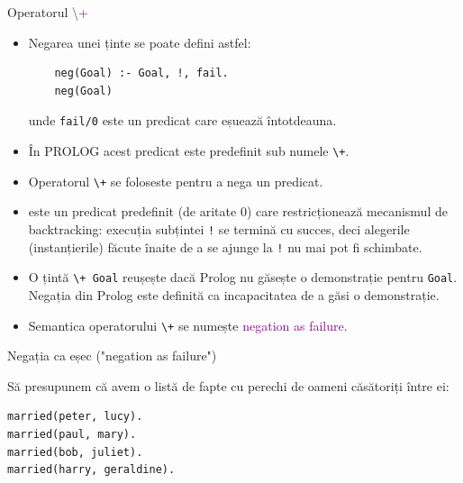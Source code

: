 \documentclass[xcolor=x11names,compress,10pt]{beamer}
\begin{document}
\begin{frame}[fragile]{Operatorul \textcolor{purple}{\textbackslash +}}

\begin{itemize}
	\item  Negarea unei ținte se poate defini astfel:
	
	\begin{verbatim}
    neg(Goal) :- Goal, !, fail.
    neg(Goal)
	\end{verbatim}

unde  \alert{\texttt{fail/0}} este un predicat care eșuează întotdeauna.
\pause
\item \^{I}n PROLOG acest predicat este predefinit sub numele {\texttt {\textbackslash +}}. 
\item Operatorul  \texttt{\textbackslash +} se foloseste pentru a nega un predicat.
	\item {} este un predicat predefinit (de aritate 0) care restricționează mecanismul de backtracking:   execuția subțintei \texttt{!} se termină  cu succes, deci alegerile (instanțierile) făcute  înaite de a se ajunge la \texttt{{!}}  nu mai pot fi schimbate.
	
\item O țintă \texttt{\textbackslash + Goal} reușește dacă Prolog nu găsește o demonstrație pentru \texttt{Goal}. Negația din Prolog este definită ca incapacitatea de a găsi o demonstrație.

	\item Semantica operatorului \texttt{{\textbackslash +}} se numește \textcolor{purple}{negation as failure}.

\end{itemize}


\end{frame}

\begin{frame}[fragile]{Negația ca eșec ("negation as failure")}

\begin{example}
Să presupunem că avem o listă de fapte cu perechi de oameni căsătoriți între ei:

\begin{verbatim}
married(peter, lucy).
married(paul, mary).
married(bob, juliet).
married(harry, geraldine).
\end{verbatim}
\end{example}
\end{frame}
\end{document}
